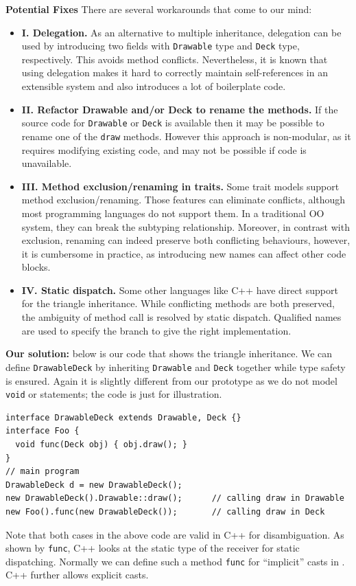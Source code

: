 \noindent\textbf{Potential Fixes} There are several workarounds that come to our mind:
\begin{itemize}
  \item \textbf{I. Delegation.} As an alternative to multiple inheritance,
  delegation can be used by introducing two fields with
  \lstinline|Drawable| type and \lstinline|Deck| type,
  respectively. This avoids method conflicts. Nevertheless, it is known
  that using delegation makes it hard to correctly maintain
  self-references in an extensible system and also
  introduces a lot of boilerplate code.
  \item \textbf{II. Refactor Drawable and/or Deck to rename the methods.} If
  the source code for \lstinline|Drawable| or \lstinline|Deck| is available
  then it may be possible to rename one of the \lstinline|draw|
  methods. However this approach is non-modular, as it requires 
  modifying existing code, and may not be possible if code is unavailable.
  \item \textbf{III. Method exclusion/renaming in traits.} Some trait models
  support method exclusion/renaming. Those features
   can eliminate conflicts, although most
  programming languages do not support them. In a traditional OO system,
  they can break the subtyping relationship. Moreover, in
  contrast with exclusion, renaming can indeed preserve both conflicting
  behaviours, however, it is cumbersome in practice, as introducing new
  names can affect other code blocks.
  \item \textbf{IV. Static dispatch.} Some other languages like C++ have
  direct support for the triangle inheritance. While conflicting methods are
  both preserved, the ambiguity of method call is resolved by static dispatch.
  Qualified names are used to specify the branch to give the right implementation.
\end{itemize}

\noindent\textbf{Our solution:} below is our code that shows the triangle
inheritance.
We can define \lstinline|DrawableDeck| by inheriting \lstinline|Drawable| and \lstinline|Deck| together while
type safety is ensured. Again it is slightly different from our prototype as we do not model \lstinline|void| or statements;
the code is just for illustration.
\vspace{3pt}\begin{lstlisting}
interface DrawableDeck extends Drawable, Deck {}
interface Foo {
  void func(Deck obj) { obj.draw(); }
}
// main program
DrawableDeck d = new DrawableDeck();
new DrawableDeck().Drawable::draw();      // calling draw in Drawable
new Foo().func(new DrawableDeck());       // calling draw in Deck
\end{lstlisting}\vspace{3pt}
Note that both cases in the above code are valid in C++ for disambiguation. As shown by \lstinline|func|, C++ looks at
the static type of the receiver for static dispatching. Normally we can define such a method \lstinline|func| for ``implicit''
casts in \name{}. C++ further allows explicit casts.

